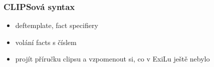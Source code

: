 \subsubsection{CLIPSová syntax}
\begin{framed}
  \begin{itemize}
    \item deftemplate, fact specifiery
    \item volání facts s číslem
    \item projít příručku clipsu a vzpomenout si, co v ExiLu ještě nebylo
  \end{itemize}
\end{framed}
